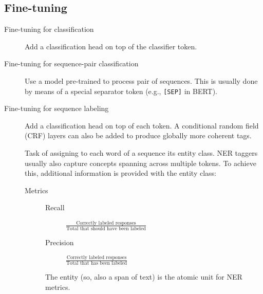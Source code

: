 \subsection{Fine-tuning}

\begin{description}
    \item[Fine-tuning for classification]
        Add a classification head on top of the classifier token.

    \item[Fine-tuning for sequence-pair classification]
        Use a model pre-trained to process pair of sequences. This is usually done by means of a special separator token (e.g., \texttt{[SEP]} in BERT).

    \item[Fine-tuning for sequence labeling]
        Add a classification head on top of each token. A conditional random field (CRF) layers can also be added to produce globally more coherent tags.

        \begin{example}
            Task of assigning to each word of a sequence its entity class. NER taggers usually also capture concepts spanning across multiple tokens. To achieve this, additional information is provided with the entity class:

            \begin{description}
                \item[Metrics] \phantom{}
                    \begin{description}
                        \item[Recall] $\frac{\text{Correctly labeled responses}}{\text{Total that should have been labeled}}$
                        \item[Precision] $\frac{\text{Correctly labeled responses}}{\text{Total that has been labeled}}$
                    \end{description}

                    \begin{remark}
                        The entity (so, also a span of text) is the atomic unit for NER metrics.
                    \end{remark}
            \end{description}
        \end{example}
\end{description}


